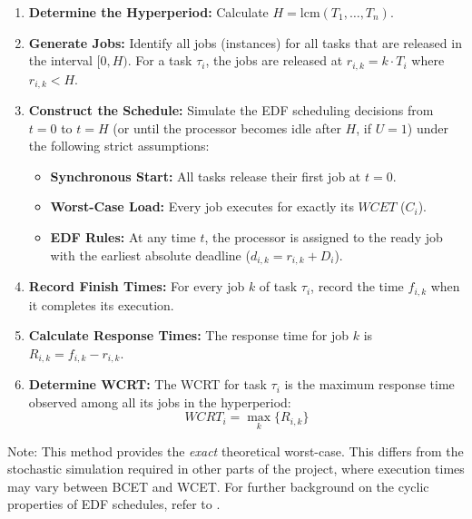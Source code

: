 \documentclass[a4paper,11pt]{article}
\begin{document}
\begin{enumerate}
    \item \textbf{Determine the Hyperperiod:} Calculate $H = \text{lcm}(T_1, \dots, T_n)$.
    
    \item \textbf{Generate Jobs:} Identify all jobs (instances) for all tasks that are released in the interval $[0, H)$. For a task $\tau_i$, the jobs are released at $r_{i,k} = k \cdot T_i$ where $r_{i,k} < H$.
    
    \item \textbf{Construct the Schedule:} Simulate the EDF scheduling decisions from $t=0$ to $t=H$ (or until the processor becomes idle after $H$, if $U=1$) under the following strict assumptions:
    \begin{itemize}
        \item \textbf{Synchronous Start:} All tasks release their first job at $t=0$.
        \item \textbf{Worst-Case Load:} Every job executes for exactly its $WCET$ ($C_i$).
        \item \textbf{EDF Rules:} At any time $t$, the processor is assigned to the ready job with the earliest absolute deadline ($d_{i,k} = r_{i,k} + D_i$).
    \end{itemize}
    
    \item \textbf{Record Finish Times:} For every job $k$ of task $\tau_i$, record the time $f_{i,k}$ when it completes its execution.
    
    \item \textbf{Calculate Response Times:} The response time for job $k$ is $R_{i,k} = f_{i,k} - r_{i,k}$.
    
    \item \textbf{Determine WCRT:} The WCRT for task $\tau_i$ is the maximum response time observed among all its jobs in the hyperperiod:
    \begin{equation}
        WCRT_i = \max_{k} \{ R_{i,k} \}
    \end{equation}
\end{enumerate}

Note: This method provides the \textit{exact} theoretical worst-case. This differs from the stochastic simulation required in other parts of the project, where execution times may vary between BCET and WCET. For further background on the cyclic properties of EDF schedules, refer to \cite{buttazzo2024}.
\end{document}
